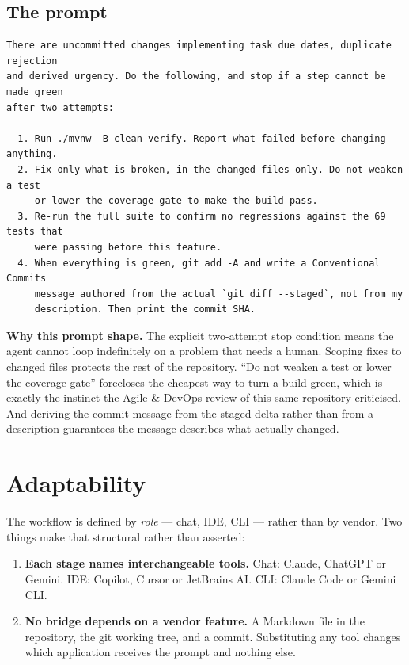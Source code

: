\documentclass[11pt,a4paper]{article}
\begin{document}
\subsection{The prompt}

\begin{lstlisting}[style=plain]
There are uncommitted changes implementing task due dates, duplicate rejection
and derived urgency. Do the following, and stop if a step cannot be made green
after two attempts:

  1. Run ./mvnw -B clean verify. Report what failed before changing anything.
  2. Fix only what is broken, in the changed files only. Do not weaken a test
     or lower the coverage gate to make the build pass.
  3. Re-run the full suite to confirm no regressions against the 69 tests that
     were passing before this feature.
  4. When everything is green, git add -A and write a Conventional Commits
     message authored from the actual `git diff --staged`, not from my
     description. Then print the commit SHA.
\end{lstlisting}

\noindent \textbf{Why this prompt shape.} The explicit two-attempt stop
condition means the agent cannot loop indefinitely on a problem that needs a
human. Scoping fixes to changed files protects the rest of the repository.
``Do not weaken a test or lower the coverage gate'' forecloses the cheapest way
to turn a build green, which is exactly the instinct the Agile \& DevOps review
of this same repository criticised. And deriving the commit message from the
staged delta rather than from a description guarantees the message describes
what actually changed.

\section{Adaptability}

The workflow is defined by \emph{role} --- chat, IDE, CLI --- rather than by
vendor. Two things make that structural rather than asserted:

\begin{enumerate}
  \item \textbf{Each stage names interchangeable tools.} Chat: Claude, ChatGPT
        or Gemini. IDE: Copilot, Cursor or JetBrains AI. CLI: Claude Code or
        Gemini CLI.
  \item \textbf{No bridge depends on a vendor feature.} A Markdown file in the
        repository, the git working tree, and a commit. Substituting any tool
        changes which application receives the prompt and nothing else.
\end{enumerate}
\end{document}
